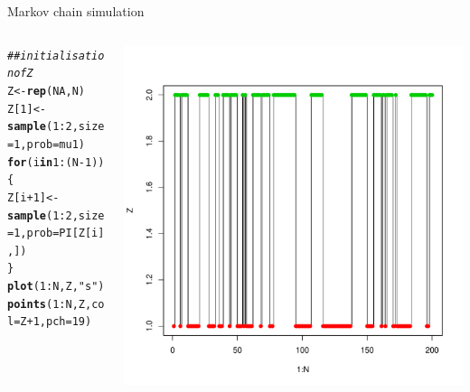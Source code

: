 \documentclass{beamer}\usepackage[]{graphicx}\usepackage[]{color}
\makeatletter
\newcommand{\hlnum}[1]{\textcolor[rgb]{0.686,0.059,0.569}{#1}}%
\newcommand{\hlstr}[1]{\textcolor[rgb]{0.192,0.494,0.8}{#1}}%
\newcommand{\hlcom}[1]{\textcolor[rgb]{0.678,0.584,0.686}{\textit{#1}}}%
\newcommand{\hlopt}[1]{\textcolor[rgb]{0,0,0}{#1}}%
\newcommand{\hlstd}[1]{\textcolor[rgb]{0.345,0.345,0.345}{#1}}%
\newcommand{\hlkwa}[1]{\textcolor[rgb]{0.161,0.373,0.58}{\textbf{#1}}}%
\newcommand{\hlkwb}[1]{\textcolor[rgb]{0.69,0.353,0.396}{#1}}%
\newcommand{\hlkwc}[1]{\textcolor[rgb]{0.333,0.667,0.333}{#1}}%
\newcommand{\hlkwd}[1]{\textcolor[rgb]{0.737,0.353,0.396}{\textbf{#1}}}%
\newenvironment{kframe}{%
 \def\at@end@of@kframe{}%
 \ifinner\ifhmode%
  \def\at@end@of@kframe{\end{minipage}}%
  \begin{minipage}{\columnwidth}%
 \fi\fi%
 \def\FrameCommand##1{\hskip\@totalleftmargin \hskip-\fboxsep
 \colorbox{shadecolor}{##1}\hskip-\fboxsep
     \hskip-\linewidth \hskip-\@totalleftmargin \hskip\columnwidth}%
 \MakeFramed {\advance\hsize-\width
   \@totalleftmargin\z@ \linewidth\hsize
   \@setminipage}}%
 {\par\unskip\endMakeFramed%
 \at@end@of@kframe}
\newenvironment{knitrout}{}{} %
\makeatother
\begin{document}
\begin{frame}[fragile]{Markov chain simulation}
\begin{columns}
\begin{column}{0.5\textwidth}
\begin{knitrout}
\begin{kframe}
\begin{alltt}
\hlcom{##initialisation of Z}
\hlstd{Z} \hlkwb{<-} \hlkwd{rep}\hlstd{(}\hlnum{NA}\hlstd{, N)}
\hlstd{Z[}\hlnum{1}\hlstd{]} \hlkwb{<-} \hlkwd{sample}\hlstd{(}\hlnum{1}\hlopt{:}\hlnum{2}\hlstd{,} \hlkwc{size}\hlstd{=}\hlnum{1}\hlstd{,} \hlkwc{prob} \hlstd{= mu1)}
\hlkwa{for}\hlstd{( i} \hlkwa{in} \hlnum{1}\hlopt{:}\hlstd{(N}\hlopt{-}\hlnum{1}\hlstd{))}
\hlstd{\{}
  \hlstd{Z[i}\hlopt{+}\hlnum{1}\hlstd{]} \hlkwb{<-} \hlkwd{sample}\hlstd{(}\hlnum{1}\hlopt{:}\hlnum{2}\hlstd{,} \hlkwc{size}\hlstd{=}\hlnum{1}\hlstd{,} \hlkwc{prob} \hlstd{= PI[Z[i],])}
\hlstd{\}}
\hlkwd{plot}\hlstd{(}\hlnum{1}\hlopt{:}\hlstd{N, Z,} \hlstr{"s"}\hlstd{)}
\hlkwd{points}\hlstd{(}\hlnum{1}\hlopt{:}\hlstd{N, Z,} \hlkwc{col}\hlstd{=Z}\hlopt{+}\hlnum{1}\hlstd{,} \hlkwc{pch}\hlstd{=}\hlnum{19}\hlstd{)}
\end{alltt}
\end{kframe}
\end{knitrout}
\end{column}
\begin{column}{0.4\textwidth}
\includegraphics[scale=0.3]{hmmCode1-1.pdf}
\end{column}
\end{columns}
\end{frame}
\end{document}
